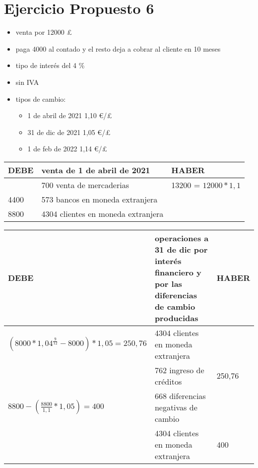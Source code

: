 \documentclass[a4paper,12pt]{article}
\begin{document}
\section{Ejercicio Propuesto 6}
\begin{itemize}
    \item venta por 12000 \pounds
    \item paga 4000 al contado y el resto deja a cobrar al cliente en 10 meses 
    \item tipo de interés del 4 \%
    \item sin IVA
    \item tipos de cambio:
    \begin{itemize}
        \item 1 de abril de 2021 1,10 \euro/\pounds
        \item 31 de dic de 2021 1,05 \euro/\pounds
        \item 1 de feb de 2022 1,14 \euro/\pounds
    \end{itemize}
\end{itemize}
\begin{table}[H]
    \centering
    \begin{tabular}{|p{3cm}|p{6cm}|p{3cm}|}
    \hline
    \textbf{DEBE} & \textbf{venta de 1 de abril de 2021} & \textbf{HABER} \\
    \hline
    & 700 venta de mercaderias & 13200 = $12000*1,1$ \\
    \hline
    4400 & 573 bancos en moneda extranjera& \\
    \hline
    8800 & 4304 clientes en moneda extranjera & \\
    \hline
    \end{tabular}
\end{table}

\begin{table}[H]
        \centering
        \begin{tabular}{|p{3cm}|p{6cm}|p{3cm}|}
        \hline
        \textbf{DEBE} & \textbf{operaciones a 31 de dic por interés financiero y por las diferencias de cambio producidas} & \textbf{HABER} \\
        \hline
        $(8000*1,04^{\frac{9}{12}}-8000) * 1,05 = 250,76$& 4304 clientes en moneda extranjera& \\
        \hline
        & 762 ingreso de créditos & 250,76\\
        \hline
        $8800-(\frac{8800}{1,1}*1,05) = 400$& 668 diferencias  negativas de cambio& \\
        \hline
        & 4304 clientes en moneda extranjera& 400\\
        \hline
        \end{tabular}
    \end{table}
\end{document}
